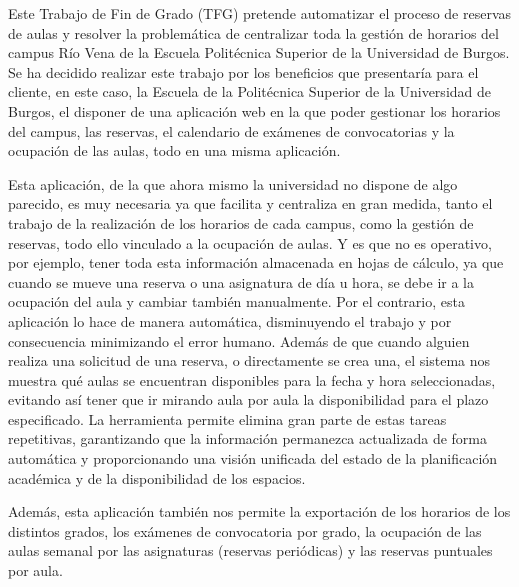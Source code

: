 
Este Trabajo de Fin de Grado (TFG) pretende automatizar el proceso de reservas de aulas y resolver la problemática de centralizar toda la gestión de horarios del campus Río Vena de la Escuela Politécnica Superior de la Universidad de Burgos. Se ha decidido realizar este trabajo por los beneficios que presentaría para el cliente, en este caso, la Escuela de la Politécnica Superior de la Universidad de Burgos, el disponer de una aplicación web en la que poder gestionar los horarios del campus, las reservas, el calendario de exámenes de convocatorias y la ocupación de las aulas, todo en una misma aplicación.

Esta aplicación, de la que ahora mismo la universidad no dispone de algo parecido, es muy necesaria ya que facilita y centraliza en gran medida, tanto el trabajo de la realización de los horarios de cada campus, como la gestión de reservas, todo ello vinculado a la ocupación de aulas. Y es que no es operativo, por ejemplo, tener toda esta información almacenada en hojas de cálculo, ya que cuando se mueve una reserva o una asignatura de día u hora, se debe ir a la ocupación del aula y cambiar también manualmente. Por el contrario, esta aplicación lo hace de manera automática, disminuyendo el trabajo y por consecuencia minimizando el error humano. Además de que cuando alguien realiza una solicitud de una reserva, o directamente se crea una, el sistema nos muestra qué aulas se encuentran disponibles para la fecha y hora seleccionadas, evitando así tener que ir mirando aula por aula la disponibilidad para el plazo especificado. La herramienta permite elimina gran parte de estas tareas repetitivas, garantizando que la información permanezca actualizada de forma automática y proporcionando una visión unificada del estado de la planificación académica y de la disponibilidad de los espacios.

Además, esta aplicación también nos permite la exportación de los horarios de los distintos grados, los exámenes de convocatoria por grado, la ocupación de las aulas semanal por las asignaturas (reservas periódicas) y las reservas puntuales por aula.